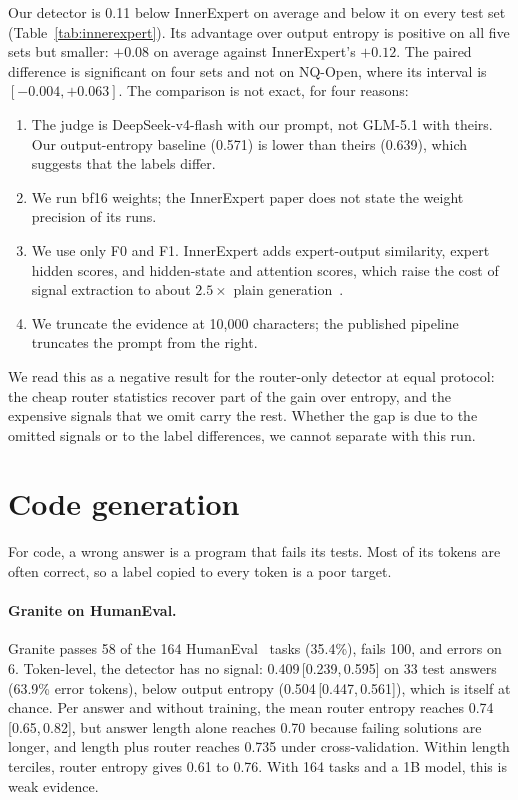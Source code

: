 \documentclass[11pt]{article}
\newcommand{\FZ}{\textsf{F0}}
\newcommand{\FO}{\textsf{F1}}
\newcommand{\ci}[2]{\,[#1,\,#2]}
\begin{document}
Our detector is 0.11 below InnerExpert on average and below it on every test set (Table~\ref{tab:innerexpert}).
Its advantage over output entropy is positive on all five sets but smaller: $+0.08$ on average against InnerExpert's $+0.12$.
The paired difference is significant on four sets and not on NQ-Open, where its interval is $[-0.004, +0.063]$.
The comparison is not exact, for four reasons:
\begin{enumerate}
  \item The judge is DeepSeek-v4-flash with our prompt, not GLM-5.1 with theirs. Our output-entropy baseline (0.571) is lower than theirs (0.639), which suggests that the labels differ.
  \item We run bf16 weights; the InnerExpert paper does not state the weight precision of its runs.
  \item We use only \FZ{} and \FO{}. InnerExpert adds expert-output similarity, expert hidden scores, and hidden-state and attention scores, which raise the cost of signal extraction to about $2.5\times$ plain generation~\citep{fonseca2026innerexpert}.
  \item We truncate the evidence at 10,000 characters; the published pipeline truncates the prompt from the right.
\end{enumerate}
We read this as a negative result for the router-only detector at equal protocol: the cheap router statistics recover part of the gain over entropy, and the expensive signals that we omit carry the rest.
Whether the gap is due to the omitted signals or to the label differences, we cannot separate with this run.

\section{Code generation}
\label{sec:code}

For code, a wrong answer is a program that fails its tests.
Most of its tokens are often correct, so a label copied to every token is a poor target.

\paragraph{Granite on HumanEval.}
Granite passes 58 of the 164 HumanEval~\citep{chen2021evaluating} tasks (35.4\%), fails 100, and errors on 6.
Token-level, the detector has no signal: 0.409\ci{0.239}{0.595} on 33 test answers (63.9\% error tokens), below output entropy (0.504\ci{0.447}{0.561}), which is itself at chance.
Per answer and without training, the mean router entropy reaches 0.74\ci{0.65}{0.82}, but answer length alone reaches 0.70 because failing solutions are longer, and length plus router reaches 0.735 under cross-validation.
Within length terciles, router entropy gives 0.61 to 0.76.
With 164 tasks and a 1B model, this is weak evidence.
\end{document}
